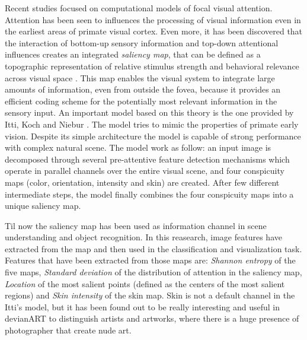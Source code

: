 Recent studies focused on computational models of focal visual attention. Attention has been seen to influences the processing of visual information even in the earliest areas of primate visual cortex. Even more, it has been discovered that the interaction of bottom-up sensory information and top-down attentional influences creates an integrated \textit{saliency map}, that can be defined as a topographic representation of relative stimulus strength and behavioral relevance across visual space \cite{Saliency_WWHW}. This map enables the visual system to integrate large amounts of information, even from outside the fovea, because it provides an efficient coding scheme for the potentially most relevant information in the sensory input. 
An important model based on this theory is the one provided by Itti, Koch and Niebur \cite{Itti_review}\cite{Itti_model}. The model tries to mimic the properties of primate early vision. Despite its simple architecture the model is capable of strong performance with complex natural scene.
The model work as follow: an input image is decomposed through several pre-attentive feature detection mechanisms which operate in parallel channels over the entire visual scene, and four conspicuity maps (color, orientation, intensity and skin) are created. After few different intermediate steps, the model finally combines the four conspicuity maps into a unique saliency map. 

Til now the saliency map has been used as information channel in scene understanding and object recognition. In this reasearch, image features have extracted from the map and then used in the classification and visualization task. Features that have been extracted from those maps are: \textit{Shannon entropy} of the five maps, \textit{Standard deviation} of the distribution of attention in the saliency map, \textit{Location} of the most salient points (defined as the centers of the most salient regions) and \textit{Skin intensity} of the skin map. Skin is not a default channel in the Itti's model, but it has been found out to be really interesting and useful in devianART to distinguish artists and artworks, where there is a huge presence of photographer that create nude art. 


